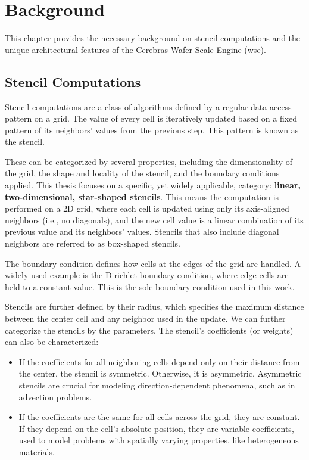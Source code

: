 \chapter{Background}
This chapter provides the necessary background on stencil computations and the unique architectural features of the Cerebras Wafer-Scale Engine (\ac{wse}).
\section{Stencil Computations}
Stencil computations are a class of algorithms defined by a regular data access pattern on a grid.
The value of every cell is iteratively updated based on a fixed pattern of its neighbors' values from the previous step.
This pattern is known as the stencil.

These can be categorized by several properties, including the dimensionality of the grid, the shape and locality of the stencil, and the boundary conditions applied.
This thesis focuses on a specific, yet widely applicable, category: \textbf{linear, two-dimensional, star-shaped stencils}.
This means the computation is performed on a 2D grid, where each cell is updated using only its axis-aligned neighbors (i.e., no diagonals), and the new cell value is a linear combination of its previous value and its neighbors' values.
Stencils that also include diagonal neighbors are referred to as box-shaped stencils.

The boundary condition defines how cells at the edges of the grid are handled.
A widely used example is the Dirichlet boundary condition, where edge cells are held to a constant value.
This is the sole boundary condition used in this work.

Stencils are further defined by their radius, which specifies the maximum distance between the center cell and any neighbor used in the update.
We can further categorize the stencils by the parameters.
The stencil's coefficients (or weights) can also be characterized:

\begin{itemize}
    \item If the coefficients for all neighboring cells depend only on their distance from the center, the stencil is symmetric. Otherwise, it is asymmetric. Asymmetric stencils are crucial for modeling direction-dependent phenomena, such as in advection problems.
    \item If the coefficients are the same for all cells across the grid, they are constant. If they depend on the cell's absolute position, they are variable coefficients, used to model problems with spatially varying properties, like heterogeneous materials.
\end{itemize}

